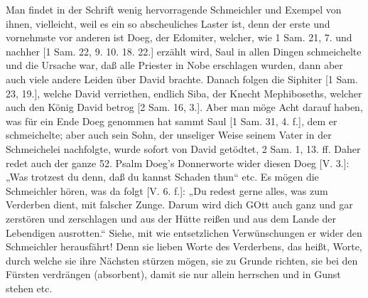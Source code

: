 Man findet in der Schrift wenig hervorragende Schmeichler und Exempel von ihnen, vielleicht, weil es ein so abscheuliches Laster ist, denn der erste und vornehmste vor anderen ist Doeg, der Edomiter, welcher, wie 1 Sam. 21, 7. und nachher [1 Sam. 22, 9. 10. 18. 22.] erzählt wird, Saul in allen Dingen schmeichelte und die Ursache war, daß alle Priester in Nobe erschlagen wurden, dann aber auch viele andere
Leiden über David brachte. Danach folgen die Siphiter [1 Sam. 23, 19.], welche David verriethen, endlich Siba, der Knecht Mephiboseths, welcher auch den König David betrog [2 Sam. 16, 3.]. Aber man möge Acht darauf haben, was für ein Ende Doeg genommen hat sammt Saul [1 Sam. 31, 4. f.], dem er schmeichelte; aber auch sein Sohn, der unseliger Weise seinem Vater in der Schmeichelei nachfolgte, wurde sofort von David getödtet, 2 Sam. 1, 13. ff. Daher redet auch der ganze 52. Psalm Doeg’s Donnerworte wider diesen Doeg [V. 3.]: „Was trotzest du denn, daß du kannst Schaden thun“ etc. Es mögen die Schmeichler hören, was da folgt [V. 6. f.]: „Du redest gerne alles, was zum Verderben dient, mit falscher Zunge. Darum wird dich GOtt auch ganz und gar zerstören und zerschlagen und aus der Hütte reißen und aus dem Lande der Lebendigen ausrotten.“ Siehe, mit wie entsetzlichen Verwünschungen er wider den Schmeichler herausfährt! Denn sie lieben Worte des Verderbens, das heißt, Worte, durch welche sie ihre Nächsten stürzen mögen, sie zu Grunde richten, sie bei den Fürsten verdrängen (absorbent), damit sie nur allein herrschen und in Gunst stehen etc.

